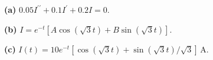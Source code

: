 \noindent\textbf{(a)} \(0.05I^{\prime\prime}+0.1I^{\prime}+0.2I=0\).

\noindent\textbf{(b)} \(I=e^{-t}[A\cos(\sqrt3t)+B\sin(\sqrt3t)]\).

\noindent\textbf{(c)} \(I(t)=10e^{-t}[\cos(\sqrt3t)+\sin(\sqrt3t)/\sqrt3]\,\mathrm A\).
